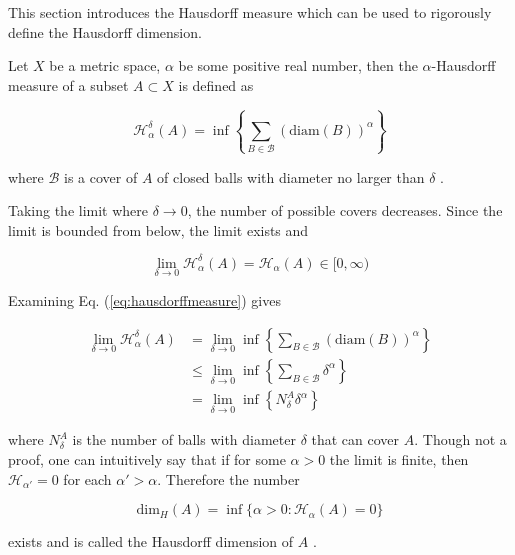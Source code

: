 This section introduces the Hausdorff measure which can be used to rigorously define the Hausdorff dimension.

Let $X$ be a metric space, $\alpha$ be some positive real number, then the $\alpha$-Hausdorff measure of a subset $A \subset X$ is defined as 

\begin{equation}
    \mathcal{H}^{\delta}_\alpha (A) = \inf \left \{ \sum_{B \in \mathcal{B}} \left ( \text{diam}(B) \right)^\alpha \right \}
\end{equation}

\noindent where $\mathcal{B}$ is a cover of $A$ of closed balls with diameter no larger than $\delta$ \cite{Heinonen:HausdorffDimMath}.

Taking the limit where $\delta \to 0$, the number of possible covers decreases. Since the limit is bounded from below, the limit exists \cite{Rudin:PrincMathAnalysis} and

\begin{equation}
    \lim_{\delta \to 0} \mathcal{H}^{\delta}_{\alpha} (A) = \mathcal{H}_\alpha (A) \in [0, \infty )
\label{eq:hausdorffmeasure}
\end{equation}

Examining Eq. (\ref{eq:hausdorffmeasure}) gives

\begin{align}
    \lim_{\delta \to 0} \mathcal{H}^{\delta}_{\alpha} (A) &= \lim_{\delta \to 0} \inf \left \{ \sum_{B \in \mathcal{B}} \left ( \text{diam}(B) \right)^\alpha \right \} \\
%
    &\leq \lim_{\delta \to 0} \inf \left \{ \sum_{B \in \mathcal{B}} \delta^\alpha \right \} \\
%
    &= \lim_{\delta \to 0} \inf \left \{ N_{\delta}^A \delta^\alpha \right \}
\end{align}

\noindent where $N_{\delta}^A$ is the number of balls with diameter $\delta$ that can cover $A$. Though not a proof, one can intuitively say that if for some $\alpha > 0$ the limit is finite, then $\mathcal{H}_{\alpha'} = 0$ for each $\alpha' > \alpha$. Therefore the number

\begin{equation}
    \text{dim}_H (A) = \inf \{ \alpha > 0 : \mathcal{H}_\alpha (A) = 0 \}
\end{equation}

\noindent exists and is called the Hausdorff dimension of $A$ \cite{Heinonen:HausdorffDimMath}.


